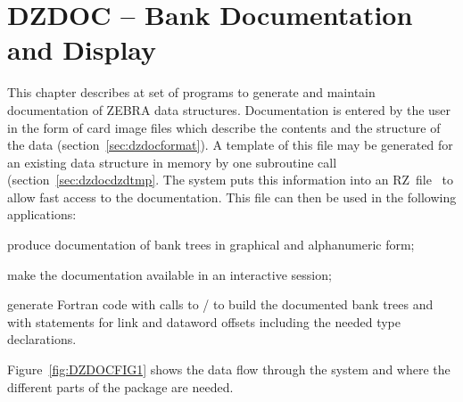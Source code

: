  
\chapter{DZDOC -- Bank Documentation and Display}
\label{sec:dzdocdescription}
 
This chapter describes at set of programs
to generate and maintain documentation of ZEBRA data structures.
Documentation is entered by the user in the form of card image files which
describe the contents and the structure of the data (section~\ref{sec:dzdocformat}).
A template of this file may be generated for an existing data structure
in memory by one subroutine call (section~\ref{sec:dzdocdzdtmp}.
The system puts this information into an RZ~file~\cite{bib-ZEBRARZ}
to allow fast access to the documentation. 
This file can then be used in the following applications:
 
\begin{UL}
\item produce documentation of bank trees in graphical and alphanumeric
      form;
\item make the documentation available in an interactive session;
\item generate Fortran code with calls to /
      to build the documented bank trees and with \break
       statements 
      for link and dataword offsets including the needed type declarations.
\end{UL}
 
Figure~\ref{fig:DZDOCFIG1} shows the data flow through the 
system and where the different parts of the package are needed.
 
